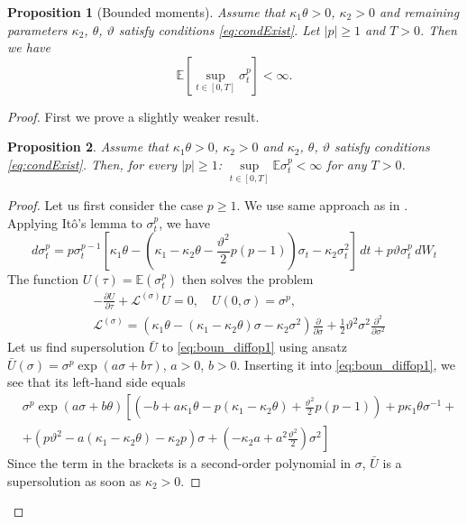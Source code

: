 \documentclass[11pt,a4paper] {article}
\newtheorem{proposition}{Proposition}[section]
\begin{document}
\begin{proposition}[Bounded moments]\label{prop:bound_moms}
Assume that $\kappa_1\theta>0$, $\kappa_2>0$ and  remaining parameters $\kappa_2$, $\theta$, $\vartheta$ satisfy conditions \eqref{eq:condExist}. Let $|p|\ge 1$ and $T>0$. Then we have
\begin{equation*}
\mathbb{E}\left[\sup_{t\in[0,T]}\sigma_t^p\right]<\infty.
\end{equation*}
\end{proposition}
\begin{proof}
First we prove a slightly weaker result. 
\begin{proposition}\label{prop:unif_bounded_mom1}
Assume that $\kappa_1\theta>0$, $\kappa_2>0$ and  $\kappa_2$, $\theta$, $\vartheta$ satisfy conditions \eqref{eq:condExist}. Then, for every $|p|\ge 1$:  $\sup\limits_{t\in[0,T]}\mathbb{E}\sigma_t^p<\infty$ for any $T>0$.
\end{proposition}
\begin{proof}
Let us first consider  the case $p\ge 1$. We use same approach as in \cite{Lions2007}. Applying It\^{o}'s lemma to $\sigma_t^p$, we have
\begin{equation*}
d\sigma_t^p=p\sigma_t^{p-1}\left[\kappa_1\theta-\left(\kappa_1-\kappa_2\theta-\frac{\vartheta^2}{2}p(p-1)\right)\sigma_t-\kappa_2\sigma_t^{2}\right]\,dt+p\vartheta\sigma_t^p\,dW_t
\end{equation*}
The function $U(\tau)=\mathbb{E}(\sigma_t^p)$ then solves the problem
\begin{equation}\label{eq:boun_diffop1}
\begin{split}
&-\frac{\partial U}{\partial \tau}+\mathcal{L}^{(\sigma)}U=0,\quad  U(0,\sigma)=\sigma^p,\\
&\mathcal{L}^{(\sigma)}=\left(\kappa_1\theta - (\kappa_1-\kappa_2\theta)\sigma-\kappa_2\sigma^2\right)\frac{\partial}{\partial \sigma}+\frac 12\vartheta^2\sigma^2\frac{\partial^2}{\partial \sigma^2}
\end{split}
\end{equation}
Let us find supersolution $\bar U$ to \eqref{eq:boun_diffop1} using ansatz $\bar U(\sigma)=\sigma^p\exp\left(a\sigma+b\tau\right)$,  $a> 0$, $b> 0$. Inserting it into \eqref{eq:boun_diffop1}, we see that its left-hand side equals
\begin{equation*}
\begin{split}
&\sigma^p\exp(a\sigma+b\theta)\left[\left(-b+a\kappa_1\theta-p(\kappa_1-\kappa_2\theta)+\frac{\vartheta^2}{2}p(p-1)\right)+p\kappa_1\theta\sigma^{-1}+\right.\\
&+\left.\left(p\vartheta^2-a(\kappa_1-\kappa_2\theta)-\kappa_2p\right)\sigma+\left(-\kappa_2a+a^2\frac{\vartheta^2}{2}\right)\sigma^2\right]
\end{split}
\end{equation*}
Since the term in the brackets is a second-order polynomial in $\sigma$, $\bar U$ is a supersolution as soon as $\kappa_2>0$. 


\end{proof}
\end{proof}
\end{document}
